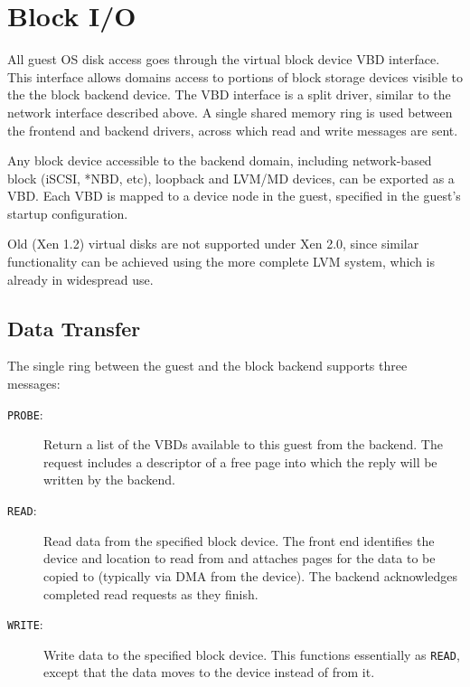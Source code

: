 \documentclass[11pt,twoside,final,openright]{xenstyle}
\begin{document}
\section{Block I/O}

All guest OS disk access goes through the virtual block device VBD
interface.  This interface allows domains access to portions of block
storage devices visible to the the block backend device.  The VBD
interface is a split driver, similar to the network interface
described above.  A single shared memory ring is used between the
frontend and backend drivers, across which read and write messages are
sent.

Any block device accessible to the backend domain, including
network-based block (iSCSI, *NBD, etc), loopback and LVM/MD devices,
can be exported as a VBD.  Each VBD is mapped to a device node in the
guest, specified in the guest's startup configuration.

Old (Xen 1.2) virtual disks are not supported under Xen 2.0, since
similar functionality can be achieved using the more complete LVM
system, which is already in widespread use.

\subsection{Data Transfer}

The single ring between the guest and the block backend supports three
messages:

\begin{description}
\item [{\small {\tt PROBE}}:] Return a list of the VBDs available to this guest
  from the backend.  The request includes a descriptor of a free page
  into which the reply will be written by the backend.

\item [{\small {\tt READ}}:] Read data from the specified block device.  The
  front end identifies the device and location to read from and
  attaches pages for the data to be copied to (typically via DMA from
  the device).  The backend acknowledges completed read requests as
  they finish.

\item [{\small {\tt WRITE}}:] Write data to the specified block device.  This
  functions essentially as {\small {\tt READ}}, except that the data moves to
  the device instead of from it.
\end{description}

\end{document}
